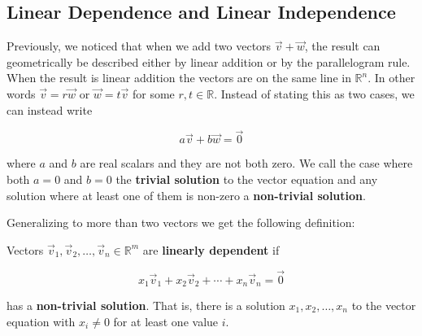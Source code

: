 \subsection{Linear Dependence and Linear Independence}

Previously, we noticed that when we add two vectors $\vec{v}+\vec{w}$, the result can geometrically be described either by linear addition or by the parallelogram rule. When the result is linear addition the vectors are on the same line in $\mathbb{R}^n$. In other words $\vec{v}=r\vec{w}$ or $\vec{w}=t\vec{v}$ for some $r,t \in \mathbb{R}$. Instead of stating this as two cases, we can instead write 

\begin{equation*}
a\vec{v}+b\vec{w}=\vec{0}
\end{equation*}

where $a$ and $b$ are real scalars and they are not both zero. We call the case where both $a=0$ and $b=0$ the \textbf{trivial solution} to the vector equation and any solution where at least one of them is non-zero a \textbf{non-trivial solution}.

Generalizing to more than two vectors we get the following definition:

\begin{definition}
Vectors $\vec{v}_1, \vec{v}_2, \ldots, \vec{v}_n \in \mathbb{R}^m$ are \textbf{linearly dependent} if 

$$x_1\vec{v}_1+x_2\vec{v}_2+\cdots + x_n \vec{v}_n=\vec{0}$$

has a \textbf{non-trivial solution}. That is, there is a solution $x_1, x_2, \ldots, x_n$ to the vector equation with $x_i \neq 0$ for at least one value $i$. 
\end{definition}

